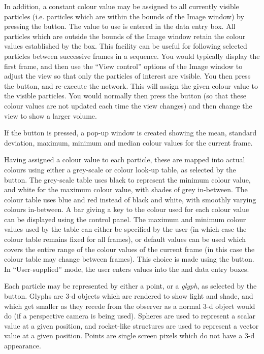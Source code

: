 \begin{description}
In addition, a constant colour value may be assigned to all currently
visible particles (i.e. particles which are within the bounds of the
Image window) by pressing the  button. The value to use is entered in the  data entry box. All particles which are
outside the bounds of the Image window retain the colour values
established by the  box. This facility can be
useful for following selected particles between successive frames in a
sequence. You would typically display the first frame, and then use the
``View control'' options of the Image window to adjust the view so that
only the particles of interest are visible. You then press the  button, and
re-execute the network. This will assign the given colour value to the
visible particles. You would normally then press the  button (so that these colour values are not updated each time the
view changes) and then change the view to show a larger volume.

If the  button is pressed, a pop-up window is
created showing the mean, standard deviation, maximum, minimum and
median colour values for the current frame.

Having assigned a colour value to each particle, these are mapped into
actual colours using either a grey-scale or colour look-up table, as
selected by the  button.  The grey-scale table
uses black to represent the minimum colour value, and white for the maximum
colour value, with shades of grey in-between. The colour table uses blue
and red instead of black and white, with smoothly varying colours in-between.
A bar giving a key to the colour used for each colour value can be
displayed using the  control panel. The
maximum and minimum colour values used by the table can either be
specified by the user (in which case the colour table remains fixed for
all frames), or default values can be used which covers the entire range
of the colour values of the current frame (in this case the colour table
may change between frames). This choice is made using the
 button.  In ``User-supplied'' mode, the
user enters values into the  and
 data entry boxes.

Each particle may be represented by either a point, or a {\em glyph}, as
selected by the  button.  Glyphs are 3-d objects
which are rendered to show light and shade, and which get smaller as they
recede from the observer as a normal 3-d object would do (if a
perspective camera is being used). Spheres are used
to represent a scalar value at a given position, and rocket-like
structures are used to represent a vector value at a given position.
Points are single screen pixels which do not have a 3-d appearance.


\end{description}
